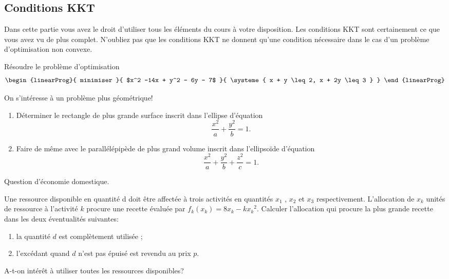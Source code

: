 \documentclass[11pt, a4paper]{article}
\begin{document}
\subsection{Conditions KKT}

Dans cette partie vous avez le droit d'utiliser tous les éléments du
cours à votre disposition. Les conditions KKT sont certainement ce que
vous avez vu de plus complet. N'oubliez pas que les conditions KKT ne
donnent qu'une condition nécessaire dans le cas d'un problème
d'optimisation non convexe.

\begin{question}
  Résoudre le problème d'optimisation
  \[
  \begin{linearProg}{
      minimiser
    }{
      $x^2 -14x + y^2 - 6y - 7$
    }{
      \systeme{
        x + y \leq 2,
        x + 2y \leq 3
      }
    }
  \end{linearProg}
  \]
\end{question}

\noindent On s'intéresse à un problème plus géométrique!

\begin{question}
  \begin{enumerate}
  \item
    Déterminer le rectangle de plus grande surface inscrit dans
    l'ellipse d'équation
    \[
    \frac{x^2}{a} + \frac{y^2}{b} = 1.
    \]
  \item
    Faire de même avec le parallélépipède de plus grand volume inscrit
    dans l'ellipsoïde d'équation
    \[
    \frac{x^2}{a} + \frac{y^2}{b} + \frac{z^2}{c} = 1.
    \]
  \end{enumerate}
\end{question}

\noindent Question d'économie domestique.

\begin{question}
  Une ressource disponible en quantité d doit être affectée à trois
  activités en quantités $x_1$ , $x_2$ et $x_3$
  respectivement. L’allocation de $x_k$ unités de ressource à
  l’activité $k$ procure une recette évaluée par
  $f_k(x_k) = 8x_k - k{x_k}^2$. Calculer l'allocation qui procure la
  plus grande recette dans les deux éventualités suivantes:
  \begin{enumerate}
  \item la quantité $d$ est complètement utilisée ;
  \item l'excédant quand $d$ n'est pas épuisé est revendu au prix $p$.
  \end{enumerate}
  A-t-on intérêt à utiliser toutes les ressources disponibles?
\end{question}
\end{document}
